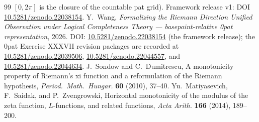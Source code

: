 \documentclass{article}
\renewcommand{\_}{\underscoreOrig\allowbreak}
\begin{document}
\begin{thebibliography}{99}
$[0,2\pi]$ is the closure of the countable pat grid). Framework release
v1: DOI
\href{https://doi.org/10.5281/zenodo.22038154}{10.5281/zenodo.22038154}.
Y.~Wang, \emph{Formalizing the Riemann Direction Unified Observation
under Logical Completeness Theory --- basepoint-relative 0pat
representation}, 2026. DOI:
\href{https://doi.org/10.5281/zenodo.22038154}{10.5281/zenodo.22038154}
(the framework release); the 0pat Exercise XXXVII revision packages are
recorded at \href{https://doi.org/10.5281/zenodo.22039506}{10.5281/zenodo.22039506},
\href{https://doi.org/10.5281/zenodo.22044557}{10.5281/zenodo.22044557}, and
\href{https://doi.org/10.5281/zenodo.22044634}{10.5281/zenodo.22044634}.
J.~Sondow and C.~Dumitrescu, A monotonicity property of Riemann's xi
function and a reformulation of the Riemann hypothesis, \emph{Period.\
Math.\ Hungar.} \textbf{60} (2010), 37--40.
Yu.~Matiyasevich, F.~Saidak, and P.~Zvengrowski, Horizontal monotonicity
of the modulus of the zeta function, $L$-functions, and related
functions, \emph{Acta Arith.} \textbf{166} (2014), 189--200.
\end{thebibliography}
\end{document}
